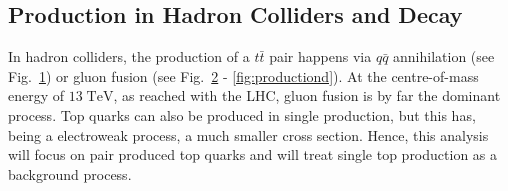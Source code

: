 	\subsection{Production in Hadron Colliders and Decay}
	In hadron colliders, the production of a $t\bar{t}$ pair happens via $q\bar{q}$ annihilation (see Fig.~\ref{fig:productiona}) or gluon fusion (see Fig.~\ref{fig:productionb} - \ref{fig:productiond}). At the centre-of-mass energy of $13\;\text{TeV}$, as reached with the LHC, gluon fusion is by far the dominant process. Top quarks can also be produced in single production, but this has, being a electroweak process, a much smaller cross section. Hence, this analysis will focus on pair produced top quarks and will treat single top production as a background process.
	\begin{figure}
		\centering
		\begin{subfigure}{.4\textwidth}
		\caption{}
		\label{fig:productiona}
		\end{subfigure}
		\begin{subfigure}{.4\textwidth}
		\caption{}
		\label{fig:productionb}
		\end{subfigure}		
		\begin{subfigure}{.4\textwidth}
\end{subfigure}
\end{figure}
